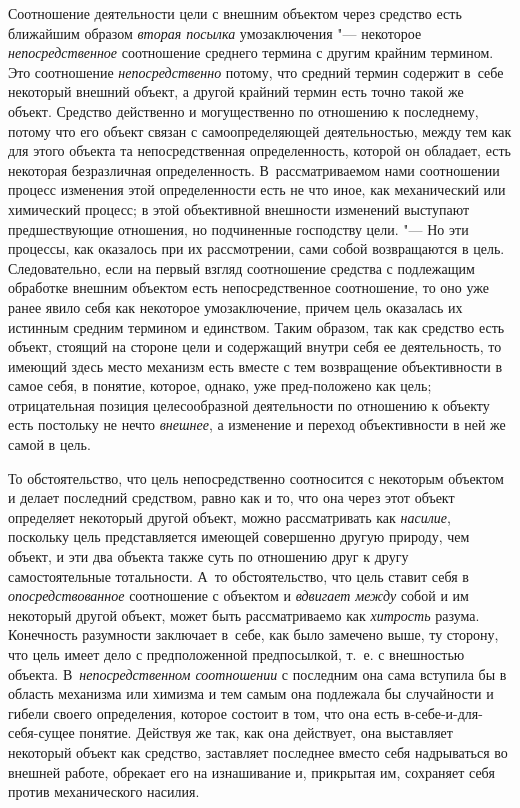Соотношение деятельности цели с внешним объектом через
средство есть ближайшим образом {\em вторая посылка}
умозаключения "--- некоторое {\em непосредственное}
соотношение среднего термина с другим крайним термином. Это
соотношение {\em непосредственно}
потому, что средний термин содержит в~себе некоторый внешний
объект, а другой крайний термин есть точно такой же объект. Средство
действенно и могущественно по отношению к последнему, потому что его объект
связан с самоопределяющей деятельностью, между тем как для этого объекта та
непосредственная определенность, которой он обладает, есть некоторая
безразличная определенность. В~рассматриваемом нами соотношении процесс
изменения этой определенности есть не что иное, как механический или
химический процесс; в этой объективной внешности изменений выступают
предшествующие отношения, но подчиненные господству цели. "---
Но эти процессы, как оказалось при их рассмотрении, сами
собой возвращаются в цель. Следовательно, если на первый взгляд соотношение
средства с подлежащим обработке внешним объектом есть непосредственное
соотношение, то оно уже ранее явило себя как некоторое умозаключение,
причем цель оказалась их истинным средним термином и единством. Таким
образом, так как средство есть объект, стоящий на стороне цели и содержащий
внутри себя ее деятельность, то имеющий здесь место механизм есть вместе с
тем возвращение объективности в самое себя, в понятие, которое, однако, уже
пред-положено как цель; отрицательная позиция целесообразной деятельности
по отношению к объекту есть постольку не нечто
{\em внешнее}, а
изменение и переход объективности в ней же самой в цель.

То обстоятельство, что цель непосредственно соотносится с
некоторым объектом и делает последний средством, равно как и то, что она
через этот объект определяет некоторый другой объект, можно рассматривать
как {\em насилие},
поскольку цель представляется имеющей совершенно другую
природу, чем объект, и эти два объекта также суть по отношению друг к другу
самостоятельные тотальности. А~то обстоятельство, что цель ставит себя в
{\em опосредствованное}
соотношение с объектом и
{\em вдвигает между}
собой и им некоторый другой объект, может быть рассматриваемо
как {\em хитрость}
разума. Конечность разумности заключает в~себе, как было
замечено выше, ту сторону, что цель имеет дело с
предположенной предпосылкой, т.~е. с внешностью объекта.
В~{\em непосредственном соотношении}
с последним она сама вступила бы в область механизма или
химизма и тем самым она подлежала бы случайности и гибели своего
определения, которое состоит в том, что она есть в-себе-и-для-себя-сущее
понятие. Действуя же так, как она действует, она выставляет некоторый
объект как средство, заставляет последнее вместо себя надрываться во
внешней работе, обрекает его на изнашивание и, прикрытая им, сохраняет себя
против механического насилия.

